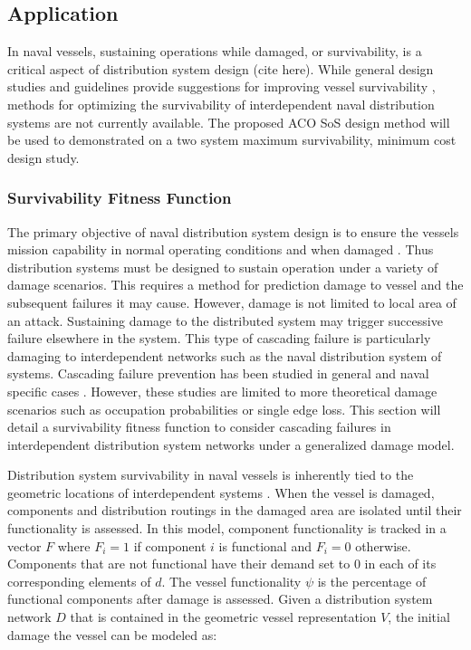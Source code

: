 \documentclass[preprint,12pt]{elsarticle}
\begin{document}
\subsection{Application}

In naval vessels, sustaining operations while damaged, or survivability, is a critical aspect of distribution system design (cite here). While general design studies and guidelines provide suggestions for improving vessel survivability \citep{Doerry2007,Kok2012}, methods for optimizing the survivability of interdependent naval distribution systems are not currently available. The proposed ACO SoS design method will be used to demonstrated on a two system maximum survivability, minimum cost design study.

                                                               

\subsubsection{Survivability Fitness Function} \label{sec:surv}
The primary objective of naval distribution system design is to ensure the vessels mission capability in normal operating conditions and when damaged \cite{Amy2002}. Thus distribution systems must be designed to sustain operation under a variety of damage scenarios. This requires a method for prediction damage to vessel and the subsequent failures it may cause. However, damage is not limited to local area of an attack. Sustaining damage to the distributed system may trigger successive failure elsewhere in the system. This type of cascading failure is particularly damaging to interdependent networks \cite{Gao2011,Schneider2013} such as the naval distribution system of systems. Cascading failure prevention has been studied in general \cite{Schneider2011,Brummitt2012} and naval specific cases \cite{Trapp2015}. However, these studies are limited to more theoretical damage scenarios such as occupation probabilities or single edge loss. This section will detail a survivability fitness function to consider cascading failures in interdependent distribution system networks under a generalized damage model.

Distribution system survivability in naval vessels is inherently tied to the geometric locations of interdependent systems \citep{Amy2002}. When the vessel is damaged, components and distribution routings in the damaged area are isolated until their functionality is assessed. In this model, component functionality is tracked in a vector $F$ where $F_i=1$ if component $i$ is functional and $F_i=0$ otherwise. Components that are not functional have their demand set to $0$ in each of its corresponding elements of $d$. The vessel functionality $\psi$ is the percentage of functional components after damage is assessed. Given a distribution system network $D$ that is contained in the geometric vessel representation $V$, the initial damage the vessel can be modeled as:
\end{document}
